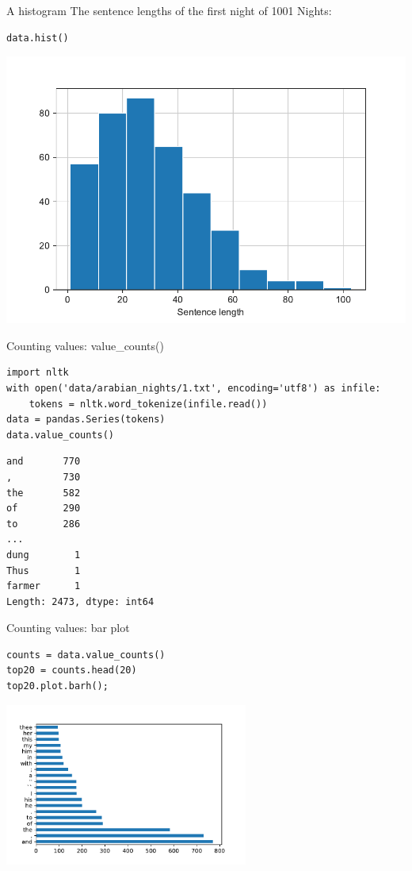 \documentclass[aspectratio=169,usenames,dvipsnames]{beamer}
\begin{document}
\begin{frame}[fragile]{A histogram}
The sentence lengths of the first night of 1001 Nights:
\begin{lstlisting}
data.hist()
\end{lstlisting}
\includegraphics[height=0.7\textheight]{fig/basichist}
\end{frame}


\begin{frame}[fragile]{Counting values: value\_counts()}
\begin{lstlisting}
import nltk
with open('data/arabian_nights/1.txt', encoding='utf8') as infile:
    tokens = nltk.word_tokenize(infile.read())
data = pandas.Series(tokens)
data.value_counts()
\end{lstlisting}
\begin{lstlisting}[style=plain]
and       770
,         730
the       582
of        290
to        286
... 
dung        1
Thus        1
farmer      1
Length: 2473, dtype: int64
\end{lstlisting}
\end{frame}

\begin{frame}[fragile]{Counting values: bar plot}
\begin{lstlisting}
counts = data.value_counts()
top20 = counts.head(20)
top20.plot.barh();
\end{lstlisting}
\includegraphics[width=0.6\textwidth]{fig/barplotwords}
\end{frame}
\end{document}
